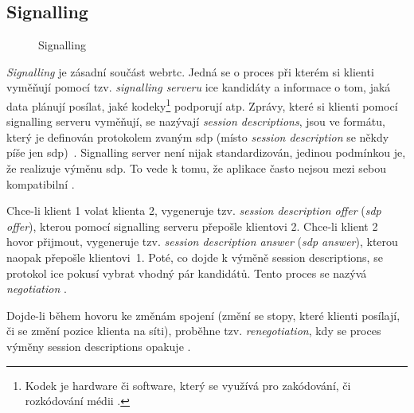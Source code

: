 \subsection{Signalling}\label{signalling}

\begin{figure}[H]
    \centering
    \caption{Signalling}
    \label{signallingServer}
\end{figure}

\textit{Signalling} je zásadní součást \gls{webrtc}. Jedná se o proces při
kterém si klienti vyměňují pomocí tzv. \textit{signalling serveru} \gls{ice}
kandidáty a informace o tom, jaká data plánují posílat, jaké
kodeky\footnote{Kodek je hardware či software, který se využívá pro zakódování,
    či rozkódování médii \parencite{Britannica-Codec,TechTarget-Codec}.} podporují
atp. Zprávy, které si klienti pomocí signalling serveru vyměňují, se nazývají
\textit{session descriptions}, jsou ve formátu, který je definován protokolem
zvaným \gls{sdp} (místo \textit{session description} se někdy píše jen
\gls{sdp})~\parencite{WebRTCForTheCurious}. Signalling server není nijak
standardizován, jedinou podmínkou je, že realizuje výměnu \gls{sdp}. To vede k
tomu, že aplikace často nejsou mezi sebou kompatibilní
\parencite{MDN-Web-SignalingAndVideoCalling}.

Chce-li klient 1 volat klienta 2, vygeneruje tzv. \textit{session description
    offer} (\textit{\gls{sdp} offer}), kterou pomocí signalling serveru přepošle
klientovi 2. Chce-li klient 2 hovor přijmout, vygeneruje tzv.
\textit{session description answer} (\textit{\gls{sdp} answer}), kterou
naopak přepošle klientovi~1. Poté, co dojde k výměně session descriptions,
se protokol \gls{ice} pokusí vybrat vhodný pár kandidátů. Tento proces se
nazývá \textit{negotiation}
\parencite{WebRTCForTheCurious,MozillaBlog-PerfectNegotiation}.

Dojde-li během hovoru ke změnám spojení (změní se stopy, které klienti posílají,
či se změní pozice klienta na síti), proběhne tzv. \textit{renegotiation}, kdy
se proces výměny session descriptions opakuje
\parencite{MozillaBlog-PerfectNegotiation}.

